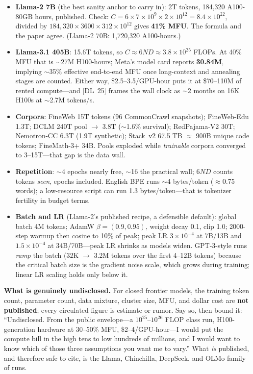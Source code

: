 \begin{itemize}[leftmargin=*,itemsep=1pt]
\item \textbf{Llama-2 7B} (the best sanity anchor to carry in): 2T tokens,
184{,}320 A100-80GB hours, published. Check: $C = 6 \times 7{\times}10^{9}
\times 2{\times}10^{12} = 8.4{\times}10^{22}$, divided by
$184{,}320 \times 3600 \times 312{\times}10^{12}$ gives \textbf{41\% MFU}. The
formula and the paper agree. (Llama-2 70B: 1{,}720{,}320 A100-hours.)
\item \textbf{Llama-3.1 405B}: 15.6T tokens, so $C \approx 6ND \approx
3.8{\times}10^{25}$ FLOPs. At 40\% MFU that is $\sim$27M H100-hours; Meta's
model card reports \textbf{30.84M}, implying $\sim$35\% effective end-to-end MFU
once long-context and annealing stages are counted. Either way,
\$2.5--3.5/GPU-hour puts it at \$70--110M of rented compute---and [DL~25] frames the wall clock as
$\sim$2 months on 16K H100s at $\sim$2.7M tokens/s.
\item \textbf{Corpora}: FineWeb 15T tokens (96 CommonCrawl snapshots);
FineWeb-Edu 1.3T; DCLM 240T pool $\rightarrow$ 3.8T ($\sim$1.6\% survival);
RedPajama-V2 30T; Nemotron-CC 6.3T (1.9T synthetic); Stack~v2 67.5 TB
$\approx$ 900B unique code tokens; FineMath-3+ 34B. Pools exploded while
\emph{trainable} corpora converged to 3--15T---that gap is the data wall.
\item \textbf{Repetition}: $\sim$4 epochs nearly free, $\sim$16 the practical
wall; $6ND$ counts tokens \emph{seen}, epochs included. English BPE runs
$\sim$4 bytes/token ($\approx$0.75 words); a low-resource script can run 1.3
bytes/token---that is tokenizer fertility in budget terms.
\item \textbf{Batch and LR} (Llama-2's published recipe, a defensible default):
global batch 4M tokens; AdamW $\beta = (0.9, 0.95)$, weight decay 0.1, clip 1.0;
2000-step warmup then cosine to 10\% of peak; peak LR $3{\times}10^{-4}$ at
7B/13B and $1.5{\times}10^{-4}$ at 34B/70B---peak LR shrinks as models widen.
GPT-3-style runs \emph{ramp} the batch (32K $\rightarrow$ 3.2M tokens over the
first 4--12B tokens) because the critical batch size is the gradient noise
scale, which grows during training; linear LR scaling holds only below it.
\end{itemize}

\begin{warningbox}
\textbf{What is genuinely undisclosed.} For closed frontier models, the training
token count, parameter count, data mixture, cluster size, MFU, and dollar cost
are \textbf{not published}; every circulated figure is estimate or rumor. Say
so, then bound it: ``Undisclosed. From the public envelope---a
$10^{25}$--$10^{26}$ FLOP class run, H100-generation hardware at 30--50\% MFU,
\$2--4/GPU-hour---I would put the compute bill in the high tens to low hundreds
of millions, and I would want to know which of those three assumptions you want
me to vary.'' What \emph{is} published, and therefore safe to cite, is the
Llama, Chinchilla, DeepSeek, and OLMo family of runs.
\end{warningbox}

